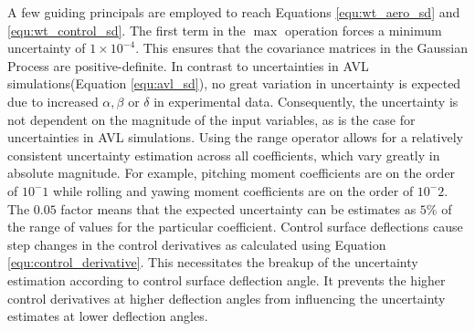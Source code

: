 A few guiding principals are employed to reach Equations \ref{equ:wt_aero_sd} and \ref{equ:wt_control_sd}.
The first term in the $\max$ operation forces a minimum uncertainty of $1\times10^{-4}$.
This ensures that the covariance matrices in the Gaussian Process are positive-definite.
In contrast to uncertainties in AVL simulations(Equation \ref{equ:avl_sd}), no great variation in uncertainty is expected due to increased $\alpha, \beta$ or $\delta$ in experimental data. 
Consequently, the uncertainty is not dependent on the magnitude of the input variables, as is the case for uncertainties in AVL simulations. 
Using the range operator allows for a relatively consistent uncertainty estimation across all coefficients, which vary greatly in absolute magnitude. 
For example, pitching moment coefficients are on the order of $10^-1$ while rolling and yawing moment coefficients are on the order of $10^-2$.
The $0.05$ factor means that the expected uncertainty can be estimates as $5\%$ of the range of values for the particular coefficient. 
Control surface deflections cause step changes in the control derivatives as calculated using Equation \ref{equ:control_derivative}.
This necessitates the breakup of the uncertainty estimation according to control surface deflection angle. 
It prevents the higher control derivatives at higher deflection angles from influencing the uncertainty estimates at lower deflection angles.

